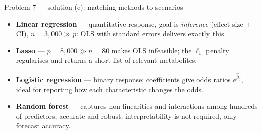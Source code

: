 \documentclass[aspectratio=169,11pt]{beamer}
\begin{document}
\begin{frame}{Problem 7 --- solution (e): matching methods to scenarios}
  \begin{solutionbox}
    \begin{itemize}
      \item[(i)] \textbf{Linear regression} --- quantitative response, goal is \emph{inference}
        (effect size $+$ CI), $n=3{,}000\gg p$: OLS with standard errors delivers exactly this.
      \item[(ii)] \textbf{Lasso} --- $p=8{,}000\gg n=80$ makes OLS infeasible; the $\ell_1$
        penalty regularises and returns a short list of relevant metabolites.
      \item[(iii)] \textbf{Logistic regression} --- binary response; coefficients give odds ratios
        $e^{\hat\beta_j}$, ideal for reporting how each characteristic changes the odds.
      \item[(iv)] \textbf{Random forest} --- captures non-linearities and interactions among
        hundreds of predictors, accurate and robust; interpretability is not required, only
        forecast accuracy.
    \end{itemize}
  \end{solutionbox}
\end{frame}
\end{document}
